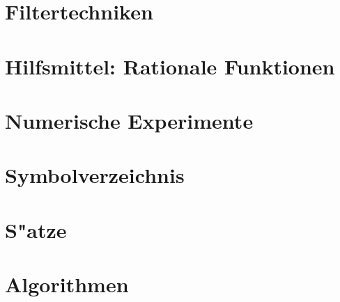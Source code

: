 \documentclass[11pt, twoside]{report}
\begin{document}
\chapter{Filtertechniken} %


\chapter{Hilfsmittel: Rationale Funktionen}%


\chapter{Numerische Experimente}


\appendix
\chapter{Symbolverzeichnis}\label{appNotation}


\chapter{S"atze}\label{appTheorems}


\chapter{Algorithmen}\label{appAlgorithms}


\nocite{*}
\printbibliography[heading=bibintoc]
\end{document}
